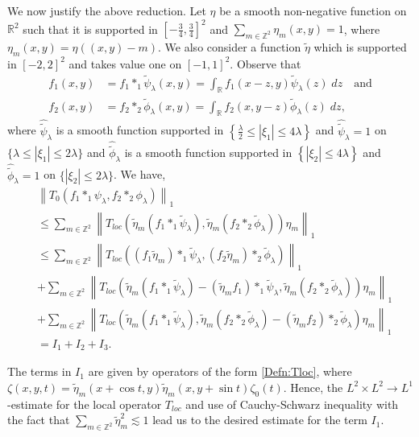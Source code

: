 \documentclass[a4paper,reqno]{amsart}
\theoremstyle{definition}
\theoremstyle{remark}
\numberwithin{equation}{section}
\newcommand{\R}{{\mathbb {R}}}
\newcommand{\Z}{{\mathbb Z}}
\begin{document}
	We now justify the above reduction. Let $\eta$ be a smooth non-negative function on $\mathbb{R}^2$ such that it is supported in $\left[-\frac{3}{4}, \frac{3}{4}\right]^2$
	and $\sum_{m\in\Z^2} \eta_m(x, y)=1$, where
	$\eta_m(x, y)=\eta((x, y)-m)$. We also consider a function $\widetilde{\eta}$ which is supported in $[-2,2]^2$ and takes value one on $[-1,1]^2$. Observe that
	\begin{align*}
		f_1(x,y)&=f_1 *_1 \widetilde{\psi}_\lambda(x,y)=\int_{\R}f_1(x-z,y)\widetilde{\psi}_\lambda(z)\;dz \quad \text{and}\\
		f_2(x,y)&=f_2 *_2 \widetilde{\phi}_\lambda(x,y)=\int_{\R}f_2(x,y-z)\widetilde{\phi}_\lambda(z)\;dz,
	\end{align*}
	where $\widehat{\widetilde{\psi}}_\lambda$ is a smooth function supported in $\left\{\frac{\lambda}{2} \leq|\xi_1| \leq 4 \lambda\right\}$ and $\widehat{\widetilde{\psi}}_\lambda=1$ on $\{\lambda \leq|\xi_1| \leq 2 \lambda\}$ and $\widehat{\widetilde{\phi}}_\lambda$ is a smooth function supported in $\left\{|\xi_2| \leq 4 \lambda\right\}$ and $\widehat{\widetilde{\phi}}_\lambda=1$ on $\{|\xi_2| \leq 2 \lambda\}$.
	We have,
	\[
	\begin{aligned}
		& \left\|T_0\left(f_1 *_1 \psi_\lambda, f_2 *_2 \phi_\lambda\right)\right\|_1 \\
		&\leq  \sum_{m \in \mathbb{Z}^2}\left\|T_{loc}\left(\widetilde{\eta}_m\left(f_1 *_1 \widetilde{\psi}_\lambda\right), \widetilde{\eta}_m\left(f_2 *_2 \widetilde{\phi}_\lambda\right)\right) \eta_m\right\|_1 \\
		&\leq  \sum_{m \in \Z^2} \left\| T_{loc}\left(\left(f_1 \widetilde{\eta}_m\right) *_1 \widetilde{\psi}_\lambda,\left(f_2 \widetilde{\eta}_m\right) *_2 \widetilde{\phi}_\lambda\right) \right\|_1 \\
		& +\sum_{m \in \Z^2}\left\|T_{loc}\left(\widetilde{\eta}_m\left(f_1 *_1 \widetilde{\psi}_\lambda\right)-\left(\widetilde{\eta}_m f_1\right) *_1 \widetilde{\psi}_\lambda, \widetilde{\eta}_m\left(f_2 *_2 \widetilde{\phi}_\lambda\right)\right) \eta_m\right\|_1 \\
		&+  \sum_{m \in \Z^2}\left\|T_{loc}\left(\widetilde{\eta}_m\left(f_1 *_1 \widetilde{\psi}_\lambda\right), \widetilde{\eta}_m\left(f_2 *_2 \widetilde{\phi}_\lambda\right)-\left(\widetilde{\eta}_m f_2\right) *_2 \widetilde{\phi}_\lambda\right) \eta_m\right\|_1 \\
		&= I_1+I_2+I_3.
	\end{aligned}
	\]
	
	The terms in $I_1$ are given by operators of the form \eqref{Defn:Tloc}, where $\zeta(x, y, t)=\widetilde{\eta}_m(x+\cos t, y) \widetilde{\eta}_m(x, y+\sin t) \zeta_0(t)$. Hence, the $L^2 \times L^2 \rightarrow L^{1}$-estimate for the local operator $T_{loc}$ and use of Cauchy-Schwarz inequality with the fact that $\sum_{m \in \Z^2} \widetilde{\eta}_m^2 \lesssim 1$ lead us to the desired estimate for the term $I_1$.
	
\end{document}
